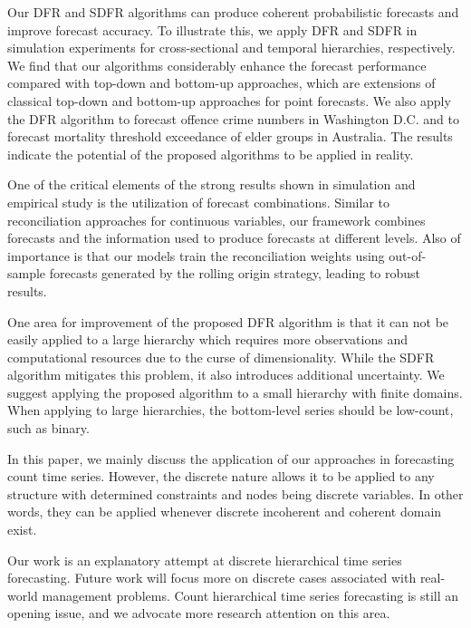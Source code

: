 \documentclass[a4paper,review,12pt,authoryear]{elsarticle}
\begin{document}
     Our DFR and SDFR algorithms can produce coherent probabilistic forecasts and improve forecast accuracy. 
     To illustrate this, we apply DFR and SDFR in simulation experiments for cross-sectional and temporal hierarchies, respectively.
     We find that our algorithms considerably enhance the forecast performance compared with top-down and bottom-up approaches, which are extensions of classical top-down and bottom-up approaches for point forecasts.
     We also apply the DFR algorithm to forecast offence crime numbers in Washington D.C. and to forecast mortality threshold exceedance of elder groups in Australia. 
     The results indicate the potential of the proposed algorithms to be applied in reality.
     
     One of the critical elements of the strong results shown in simulation and empirical study is the utilization of forecast combinations.
     Similar to reconciliation approaches for continuous variables, our framework combines forecasts and the information used to produce forecasts at different levels.
     Also of importance is that our models train the reconciliation weights using out-of-sample forecasts generated by the rolling origin strategy, leading to robust results. 
     
     One area for improvement of the proposed DFR algorithm is that it can not be easily applied to a large hierarchy which requires more observations and computational resources due to the curse of dimensionality.
     While the SDFR algorithm mitigates this problem, it also introduces additional uncertainty. 
     We suggest applying the proposed algorithm to a small hierarchy with finite domains. 
     When applying to large hierarchies, the bottom-level series should be low-count, such as binary.
     
     In this paper, we mainly discuss the application of our approaches in forecasting count time series. 
     However, the discrete nature allows it to be applied to any structure with determined constraints and nodes being discrete variables.
     In other words, they can be applied whenever discrete incoherent and coherent domain exist. 
     
     Our work is an explanatory attempt at discrete hierarchical time series forecasting. 
     Future work will focus more on discrete cases associated with real-world management problems.
     Count hierarchical time series forecasting is still an opening issue,
     and we advocate more research attention on this area.
\end{document}
